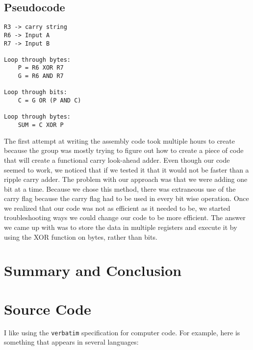 \documentclass[journal]{IEEEtran}
\begin{document}
\subsection{Pseudocode}\label{sec:pseudo}
\begin{verbatim}
R3 -> carry string
R6 -> Input A
R7 -> Input B

Loop through bytes:
	P = R6 XOR R7
	G = R6 AND R7

Loop through bits:
	C = G OR (P AND C)

Loop through bytes:
	SUM = C XOR P
\end{verbatim}

The first attempt at writing the assembly code took multiple hours to create
because the group was mostly trying to figure out how to create a piece of
code that will create a functional carry look-ahead adder. Even though our
code seemed to work, we noticed that if we tested it that it would not be
faster than a ripple carry adder. The problem with our approach was that we
were adding one bit at a time. Because we chose this method, there was
extraneous use of the carry flag because the carry flag had to be used in
every bit wise operation. Once we realized that our code was not as efficient
as it needed to be, we started troubleshooting ways we could change our code
to be more efficient. The answer we came up with was to store the data in
multiple registers and execute it by using the XOR function on bytes,
rather than bits.

\section{Summary and Conclusion}

\section{Source Code}\label{sec:code}

I like using the \verb"verbatim" specification for computer code.
For example, here is something that appears in several
languages:
\end{document}
